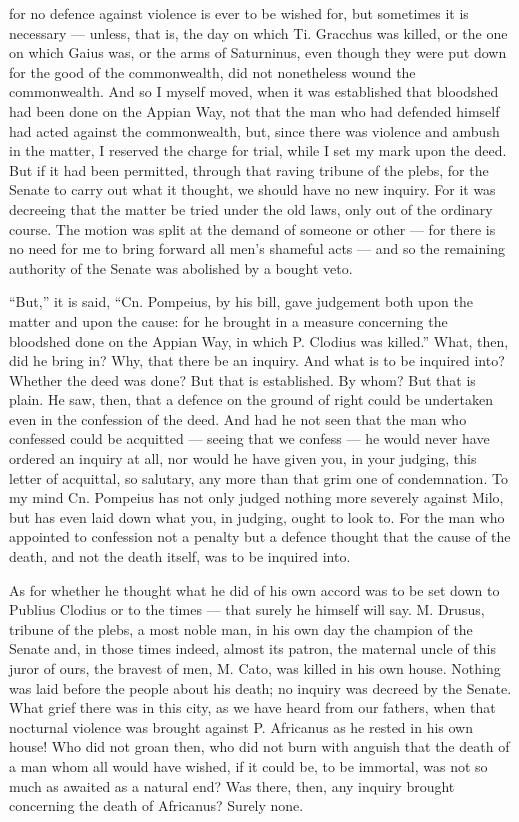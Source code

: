  for no defence against violence is ever to be wished for, but sometimes it is necessary --- unless, that is, the day on which Ti. Gracchus was killed, or the one on which Gaius was, or the arms of Saturninus, even though they were put down for the good of the commonwealth, did not nonetheless wound the commonwealth. And so I myself moved, when it was established that bloodshed had been done on the Appian Way, not that the man who had defended himself had acted against the commonwealth, but, since there was violence and ambush in the matter, I reserved the charge for trial, while I set my mark upon the deed. But if it had been permitted, through that raving tribune of the plebs, for the Senate to carry out what it thought, we should have no new inquiry. For it was decreeing that the matter be tried under the old laws, only out of the ordinary course. The motion was split at the demand of someone or other --- for there is no need for me to bring forward all men's shameful acts --- and so the remaining authority of the Senate was abolished by a bought veto.

 ``But,'' it is said, ``Cn. Pompeius, by his bill, gave judgement both upon the matter and upon the cause: for he brought in a measure concerning the bloodshed done on the Appian Way, in which P. Clodius was killed.'' What, then, did he bring in? Why, that there be an inquiry. And what is to be inquired into? Whether the deed was done? But that is established. By whom? But that is plain. He saw, then, that a defence on the ground of right could be undertaken even in the confession of the deed. And had he not seen that the man who confessed could be acquitted --- seeing that we confess --- he would never have ordered an inquiry at all, nor would he have given you, in your judging, this letter of acquittal, so salutary, any more than that grim one of condemnation. To my mind Cn. Pompeius has not only judged nothing more severely against Milo, but has even laid down what you, in judging, ought to look to. For the man who appointed to confession not a penalty but a defence thought that the cause of the death, and not the death itself, was to be inquired into.

 As for whether he thought what he did of his own accord was to be set down to Publius Clodius or to the times --- that surely he himself will say. M. Drusus, tribune of the plebs, a most noble man, in his own day the champion of the Senate and, in those times indeed, almost its patron, the maternal uncle of this juror of ours, the bravest of men, M. Cato, was killed in his own house. Nothing was laid before the people about his death; no inquiry was decreed by the Senate. What grief there was in this city, as we have heard from our fathers, when that nocturnal violence was brought against P. Africanus as he rested in his own house! Who did not groan then, who did not burn with anguish that the death of a man whom all would have wished, if it could be, to be immortal, was not so much as awaited as a natural end? Was there, then, any inquiry brought concerning the death of Africanus? Surely none.

